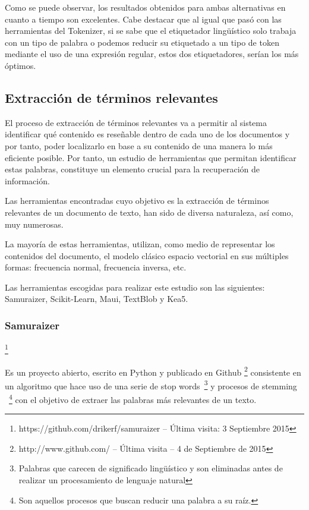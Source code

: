 \documentclass[runningheads,a4paper]{llncs}
\theoremstyle{break}
\begin{document}
Como se puede observar, los resultados obtenidos para ambas alternativas en cuanto a tiempo son excelentes.  Cabe destacar
que al igual que pasó con las herramientas del Tokenizer, si se sabe que el etiquetador lingüístico solo trabaja con un tipo de palabra o
podemos reducir su etiquetado a un tipo de token mediante el uso de una expresión regular, estos dos etiquetadores, serían los más óptimos.


\subsection{Extracción de términos relevantes}

El proceso de extracción de términos relevantes va a permitir al sistema identificar qué contenido es reseñable dentro de cada uno de los documentos y por tanto, poder localizarlo en base a su contenido de una manera lo más eficiente posible. Por tanto, un estudio de herramientas que permitan identificar estas palabras, constituye un elemento crucial para la recuperación de información.

Las herramientas encontradas cuyo objetivo es la extracción de términos relevantes de un documento de texto, han sido de diversa naturaleza, así como, muy numerosas. 

La mayoría de estas herramientas, utilizan, como medio de representar los contenidos del documento, el modelo clásico espacio vectorial en sus múltiples formas: frecuencia normal, frecuencia inversa, etc. 

Las herramientas escogidas para realizar este estudio son las siguientes: Samuraizer, Scikit-Learn, Maui, TextBlob y Kea5.

\subsubsection{Samuraizer}\footnote{https://github.com/drikerf/samuraizer -- Última visita: 3 Septiembre 2015}
\textbf{}

Es un proyecto abierto, escrito en Python y publicado en Github \footnote{http://www.github.com/ -- Última visita -- 4 de Septiembre de 2015} consistente en un algoritmo que hace uso de una serie de stop words~\footnote{Palabras que carecen de significado lingüístico y son eliminadas antes de realizar un procesamiento de lenguaje natural} y procesos de stemming ~\footnote{Son aquellos procesos que buscan reducir una palabra a su raíz.} con el objetivo de extraer las palabras más relevantes de un texto.
\end{document}
